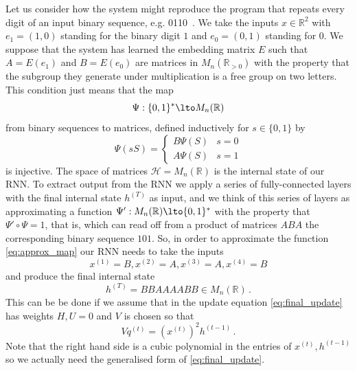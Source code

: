 \begin{example} Let us consider how the system might reproduce the program that repeats every digit of an input binary sequence, e.g.
\be\label{eq:approx_map}
0110 \,.
\ee
We take the inputs $x \in \mathbb{R}^2$ with $e_1 = (1,0)$ standing for the binary digit $1$ and $e_0 = (0,1)$ standing for $0$. We suppose that the system has learned the embedding matrix $E$ such that $A = E(e_1)$ and $B = E(e_0)$ are matrices in $M_n(\mathbb{R}_{>0})$ with the property that the subgroup they generate under multiplication is a free group on two letters. This condition just means that the map
\[
\Psi: \{0,1\}^* \lto M_n( \mathbb{R} )
\]
from binary sequences to matrices, defined inductively for $s \in \{0,1\}$ by
\[
\Psi( s S ) = \begin{cases} B \Psi(S) & s = 0 \\ A \Psi(S) & s = 1 \end{cases}
\]
is injective. The space of matrices $\mathscr{H} = M_n(\mathbb{R})$ is the internal state of our RNN. To extract output from the RNN we apply a series of fully-connected layers with the final internal state $h^{(T)}$ as input, and we think of this series of layers as approximating a function $\Psi': M_n(\mathbb{R}) \lto \{0,1\}^*$ with the property that $\Psi' \circ \Psi = 1$, that is, which can read off from a product of matrices $ABA$ the corresponding binary sequence $101$. So, in order to approximate the function \eqref{eq:approx_map} our RNN needs to take the inputs
\[
x^{(1)} = B, x^{(2)} = A, x^{(3)} = A, x^{(4)} = B
\]
and produce the final internal state
\[
h^{(T)} = BBAAAABB \in M_n(\mathbb{R})\,.
\]
This can be be done if we assume that in the update equation \eqref{eq:final_update} has weights $H, U = 0$ and $V$ is chosen so that
\[
V q^{(t)} = (x^{(t)})^2 h^{(t-1)}\,.
\]
Note that the right hand side is a cubic polynomial in the entries of $x^{(t)}, h^{(t-1)}$ so we actually need the generalised form of \eqref{eq:final_update}.
\end{example}

